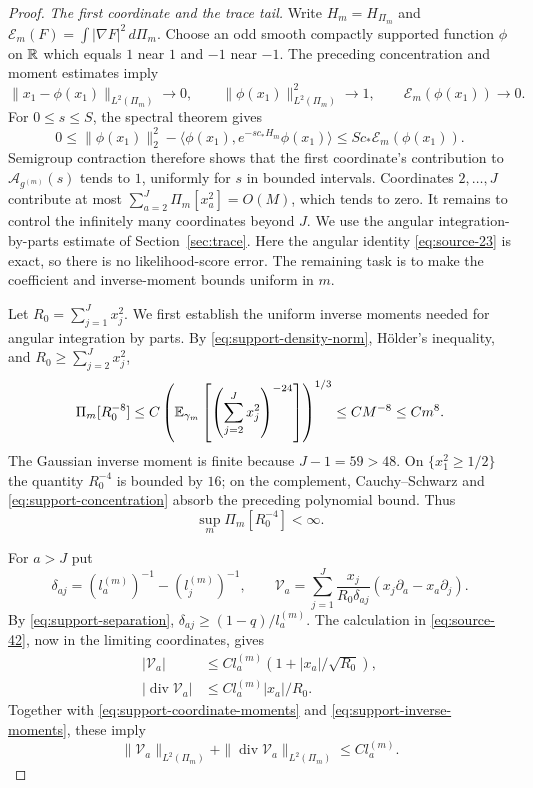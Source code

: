 \begin{proof}
\medskip\noindent
\emph{The first coordinate and the trace tail.}
Write $H_m=H_{\Pi_m}$ and
$\mathcal E_m(F)=\int|\nabla F|^2\,d\Pi_m$.
Choose an odd smooth compactly supported function $\phi$ on $\mathbb R$
which equals $1$ near $1$ and $-1$ near $-1$.  The preceding
concentration and moment estimates imply
\[
 \|x_1-\phi(x_1)\|_{L^2(\Pi_m)}\longrightarrow0,\qquad
 \|\phi(x_1)\|_{L^2(\Pi_m)}^2\longrightarrow1,\qquad
 \mathcal E_m(\phi(x_1))\longrightarrow0.
\]
For $0\le s\le S$, the spectral theorem gives
\[
 0\le \|\phi(x_1)\|_2^2
       -\langle\phi(x_1),e^{-s c_*H_m}\phi(x_1)\rangle
       \le S c_*\mathcal E_m(\phi(x_1)).
\]
Semigroup contraction therefore shows that the first coordinate's
contribution to $\mathcal A_{g^{(m)}}(s)$ tends to $1$, uniformly
for $s$ in bounded intervals.  Coordinates $2,\ldots,J$ contribute
at most $\sum_{a=2}^J\Pi_m[x_a^2]=O(M)$, which tends to zero.
It remains to control the infinitely many coordinates beyond $J$.
We use the angular integration-by-parts estimate of
Section~\ref{sec:trace}.  Here the angular identity
\eqref{eq:source-23} is exact, so there is no likelihood-score error.
The remaining task is to make the coefficient and inverse-moment
bounds uniform in $m$.

Let $R_0=\sum_{j=1}^Jx_j^2$.  We first establish the uniform inverse
moments needed for angular integration by parts.  By
\eqref{eq:support-density-norm}, H\"older's inequality, and
$R_0\ge\sum_{j=2}^Jx_j^2$,
\[
 \Pi_m[R_0^{-8}]
 \le C\left(\mathbb E_{\gamma_m}
       \left[\left(\sum_{j=2}^Jx_j^2\right)^{-24}\right]\right)^{1/3}
 \le C M^{-8}\le C m^8.
\]
The Gaussian inverse moment is finite because $J-1=59>48$.
On $\{x_1^2\ge1/2\}$ the quantity $R_0^{-4}$ is bounded by $16$;
on the complement, Cauchy--Schwarz and
\eqref{eq:support-concentration} absorb the preceding polynomial
bound.  Thus
\begin{equation}\label{eq:support-inverse-moments}
 \sup_m\Pi_m[R_0^{-4}]<\infty.
\end{equation}

For $a>J$ put
\[
 \delta_{aj}=(l_a^{(m)})^{-1}-(l_j^{(m)})^{-1},\qquad
 \mathcal V_a=\sum_{j=1}^J\frac{x_j}{R_0\delta_{aj}}
                   (x_j\partial_a-x_a\partial_j).
\]
By \eqref{eq:support-separation},
$\delta_{aj}\ge(1-q)/l_a^{(m)}$.  The calculation in
\eqref{eq:source-42}, now in the limiting coordinates, gives
\begin{align*}
 |\mathcal V_a|
   &\le C l_a^{(m)}(1+|x_a|/\sqrt{R_0}),\\
 |\operatorname{div}\mathcal V_a|
   &\le C l_a^{(m)}|x_a|/R_0.
\end{align*}
Together with \eqref{eq:support-coordinate-moments} and
\eqref{eq:support-inverse-moments}, these imply
\begin{equation}\label{eq:support-field-norms}
 \|\mathcal V_a\|_{L^2(\Pi_m)}
 +\|\operatorname{div}\mathcal V_a\|_{L^2(\Pi_m)}
 \le C l_a^{(m)}.
\end{equation}


\end{proof}
